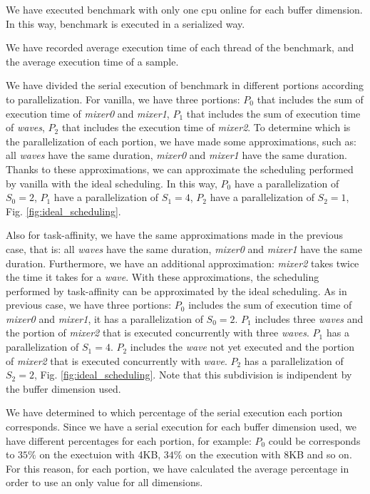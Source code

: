 \begin{enumeration}
\item We have executed benchmark with only one cpu online for each buffer dimension. In this way, benchmark is executed in a serialized way.
\item We have recorded average execution time of each thread of the benchmark, and the average execution time of a sample.
\item We have divided the serial execution of benchmark in different portions according to parallelization. For vanilla, we have three portions: $P_{0}$ 
that includes the sum of execution time of \textit{mixer0} and \textit{mixer1}, $P_{1}$ that includes the sum of execution time of \textit{waves}, $P_{2}$ 
that includes the execution time of \textit{mixer2}. To determine which is the parallelization of each portion, we have made some approximations, such as: 
all \textit{waves} have the same duration, \textit{mixer0} and \textit{mixer1} have the same duration. Thanks to these approximations, we can approximate 
the scheduling performed by vanilla with the ideal scheduling. In this way, $P_{0}$ have a parallelization of $S_{0} = 2$, $P_{1}$ have a parallelization 
of $S_{1} = 4$, $P_{2}$ have a parallelization of $S_{2} = 1$, Fig. \ref{fig:ideal_scheduling}. 

Also for task-affinity, we have the same approximations made in the previous case, that is: all \textit{waves} have the same duration, \textit{mixer0} and 
\textit{mixer1} have the same duration. Furthermore, we have an additional approximation: \textit{mixer2} takes twice the time it takes for a \textit{wave}. 
With these approximations, the scheduling performed by task-affinity can be approximated by the ideal scheduling. As in previous case, we have three 
portions: $P_{0}$ includes the sum of execution time of \textit{mixer0} and \textit{mixer1}, it has a parallelization of $S_{0} = 2$. $P_{1}$ includes 
three \textit{waves} and the portion of \textit{mixer2} that is executed concurrently with three \textit{waves}. $P_{1}$ has a parallelization of 
$S_{1} = 4$. $P_{2}$ includes the \textit{wave} not yet executed and the portion of \textit{mixer2} that is executed concurrently with \textit{wave}. 
$P_{2}$ has a parallelization of $S_{2} = 2$, Fig. \ref{fig:ideal_scheduling}. Note that this subdivision is indipendent by the buffer dimension used.

\item We have determined to which percentage of the serial execution each portion corresponds. Since we have a serial execution for each buffer dimension 
used, we have different percentages for each portion, for example: $P_{0}$ could be corresponds to $35\%$ on the exectuion with 4KB, $34\%$ on the execution 
with 8KB and so on. For this reason, for each portion, we have calculated the average percentage in order to use an only value for all dimensions.

\end{enumeration}
